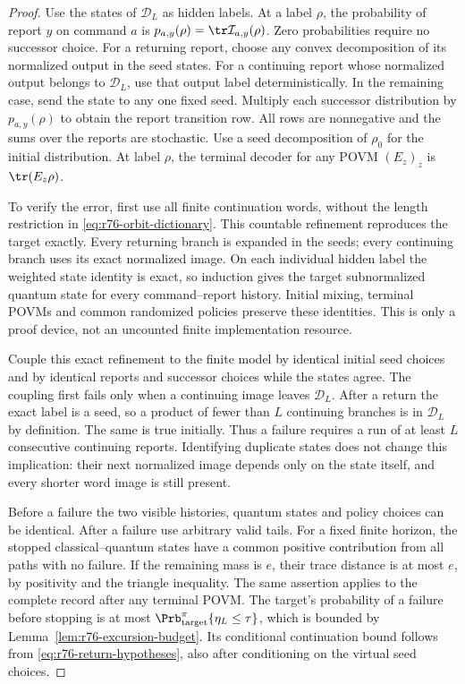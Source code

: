 \begin{proof}
Use the states of $\mathcal D_L$ as hidden labels.  At a label $\rho$,
the probability of report $y$ on command $a$ is
$p_{a,y}(\rho)=\tr\mathcal I_{a,y}(\rho)$.  Zero probabilities require
no successor choice.  For a returning report, choose any convex
decomposition of its normalized output in the seed states.  For a
continuing report whose normalized output belongs to $\mathcal D_L$,
use that output label deterministically.  In the remaining case, send
the state to any one fixed seed.  Multiply each successor distribution
by $p_{a,y}(\rho)$ to obtain the report transition row.  All rows are
nonnegative and the sums over the reports are stochastic.  Use a seed
decomposition of $\rho_0$ for the initial distribution.  At label $\rho$,
the terminal decoder for any POVM $(E_z)_z$ is $\tr(E_z\rho)$.

To verify the error, first use all finite continuation words, without
the length restriction in \eqref{eq:r76-orbit-dictionary}.  This countable
refinement reproduces the target exactly.  Every returning branch is
expanded in the seeds; every continuing branch uses its exact normalized
image.  On each individual hidden label the weighted state identity is
exact, so induction gives the target subnormalized quantum state for
every command--report history.  Initial mixing, terminal POVMs and common
randomized policies preserve these identities.  This is only a proof
device, not an uncounted finite implementation resource.

Couple this exact refinement to the finite model by identical initial
seed choices and by identical reports and successor choices while the
states agree.  The coupling first fails only when a continuing image
leaves $\mathcal D_L$.  After a return the exact label is a seed, so a
product of fewer than $L$ continuing branches is in $\mathcal D_L$ by
definition.  The same is true initially.  Thus a failure requires a run
of at least $L$ consecutive continuing reports.  Identifying duplicate
states does not change this implication: their next normalized image
depends only on the state itself, and every shorter word image is still
present.

Before a failure the two visible histories, quantum states and policy
choices can be identical.  After a failure use arbitrary valid tails.
For a fixed finite horizon, the stopped classical--quantum states have
a common positive contribution from all paths with no failure.  If the
remaining mass is $e$, their trace distance is at most $e$, by positivity
and the triangle inequality.  The same assertion applies to the complete
record after any terminal POVM.  The target's probability of a failure
before stopping is at most $\Prb_{\rm target}^{\pi}\{\eta_L\le\tau\}$,
which is bounded by Lemma~\ref{lem:r76-excursion-budget}.  Its conditional
continuation bound follows from \eqref{eq:r76-return-hypotheses}, also
after conditioning on the virtual seed choices.


\end{proof}
